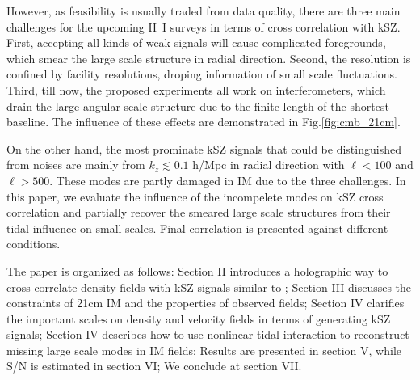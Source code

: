 However, as feasibility is usually traded from data quality, 
there are three main challenges for the upcoming H~I surveys  
in terms of cross correlation with kSZ. 
First, accepting all kinds of weak signals will cause complicated foregrounds, 
which smear the large scale structure in radial direction\cite{DiMatteo04,Masui13}. 
Second, the resolution is confined by facility resolutions, 
droping information of small scale fluctuations. 
Third, till now, the proposed experiments all work on interferometers, 
which drain the large angular scale structure  
due to the finite length of the shortest baseline. 
The influence of these effects are demonstrated in Fig.\ref{fig:cmb_21cm}.

On the other hand, the most prominate kSZ signals that could be distinguished from noises  
are mainly from $k_z\lesssim0.1$ h/Mpc in radial direction 
with $\ell < 100$ and $\ell > 500$. 
These modes are partly damaged in IM due to the three challenges. 
In this paper, we evaluate the 
influence of the incompelete modes on kSZ cross correlation 
and partially recover the smeared large scale structures 
from their tidal influence on small scales\cite{2012:pen,2015:zhu}. 
Final correlation is presented against different conditions.

The paper is organized as follows: 
Section II introduces a holographic way to 
cross correlate density fields with kSZ signals similar to \cite{Shao11}; 
Section III discusses the constraints of 21cm IM and the properties of observed fields; 
Section IV clarifies the important scales on density and velocity fields in terms of generating 
kSZ signals; 
Section IV describes how to use nonlinear tidal interaction 
to reconstruct missing large scale modes in IM fields; 
Results are presented in section V, 
while S/N is estimated in section VI; 
We conclude at section VII.
